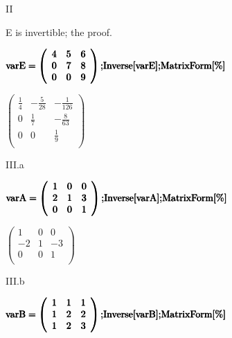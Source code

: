 \documentclass{article}
\begin{document}
II

E is invertible; the proof.
\begin{doublespace}
\noindent\(\pmb{\text{varE}=\left(
\begin{array}{ccc}
 4 & 5 & 6 \\
 0 & 7 & 8 \\
 0 & 0 & 9 \\
\end{array}
\right);}\\
\pmb{\text{Inverse}[\text{varE}];}\\
\pmb{\text{MatrixForm}[\%]}\)
\end{doublespace}

\begin{doublespace}
\noindent\(\left(
\begin{array}{ccc}
 \frac{1}{4} & -\frac{5}{28} & -\frac{1}{126} \\
 0 & \frac{1}{7} & -\frac{8}{63} \\
 0 & 0 & \frac{1}{9} \\
\end{array}
\right)\)
\end{doublespace}

III.a

\begin{doublespace}
\noindent\(\pmb{\text{varA}=\left(
\begin{array}{ccc}
 1 & 0 & 0 \\
 2 & 1 & 3 \\
 0 & 0 & 1 \\
\end{array}
\right);}\\
\pmb{\text{Inverse}[\text{varA}];}\\
\pmb{\text{MatrixForm}[\%]}\)
\end{doublespace}

\begin{doublespace}
\noindent\(\left(
\begin{array}{ccc}
 1 & 0 & 0 \\
 -2 & 1 & -3 \\
 0 & 0 & 1 \\
\end{array}
\right)\)
\end{doublespace}

III.b

\begin{doublespace}
\noindent\(\pmb{\text{varB}=\left(
\begin{array}{ccc}
 1 & 1 & 1 \\
 1 & 2 & 2 \\
 1 & 2 & 3 \\
\end{array}
\right);}\\
\pmb{\text{Inverse}[\text{varB}];}\\
\pmb{\text{MatrixForm}[\%]}\)
\end{doublespace}
\end{document}
